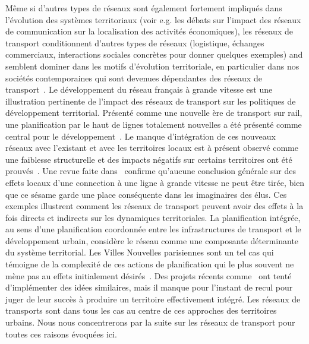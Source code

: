 { Même si d'autres types de réseaux sont également fortement impliqués dans l'évolution des systèmes territoriaux (voir e.g. les débats sur l'impact des réseaux de communication sur la localisation des activités économiques), les réseaux de transport conditionnent d'autres types de réseaux (logistique, échanges commerciaux, interactions sociales concrètes pour donner quelques exemples) and semblent dominer dans les motifs d'évolution territoriale, en particulier dans nos sociétés contemporaines qui sont devenues dépendantes des réseaux de transport~\cite{bavoux2005geographie}. Le développement du réseau français à grande vitesse est une illustration pertinente de l'impact des réseaux de transport sur les politiques de développement territorial. Présenté comme une nouvelle ère de transport sur rail, une planification par le haut de lignes totalement nouvelles   a été présenté comme central pour le développement~\cite{zembri1997fondements}. Le manque d'intégration de ces nouveaux réseaux avec l'existant et avec les territoires locaux est à présent observé comme une faiblesse structurelle et des impacts négatifs sur certains territoires ont été prouvés~\cite{zembri2008contribution}. Une revue faite dans~\cite{bazin2011grande} confirme qu'aucune conclusion générale sur des effets locaux d'une connection à une ligne à grande vitesse ne peut être tirée, 
  bien que ce sésame garde une place conséquente dans les imaginaires des élus. Ces exemples illustrent comment les réseaux de transport peuvent avoir des effets à la fois directs et indirects sur les dynamiques territoriales. La planification intégrée, au sens d'une planification coordonnée entre les infrastructures de transport et le développement urbain, considère le réseau comme une composante déterminante du système territorial. %
Les Villes Nouvelles parisiennes sont un tel cas qui témoigne de la complexité de ces actions de planification qui le plus souvent ne mène pas au effets initialement désirés~\cite{es119}. Des projets récents comme~\cite{l2012ville} ont tenté d'implémenter des idées similaires, mais il manque pour l'instant de recul pour juger de leur succès à produire un territoire effectivement intégré. 
 Les réseaux de transports sont dans tous les cas au centre de ces approches des territoires urbains. Nous nous concentrerons par la suite sur les réseaux de transport   pour toutes ces raisons évoquées ici.
}



